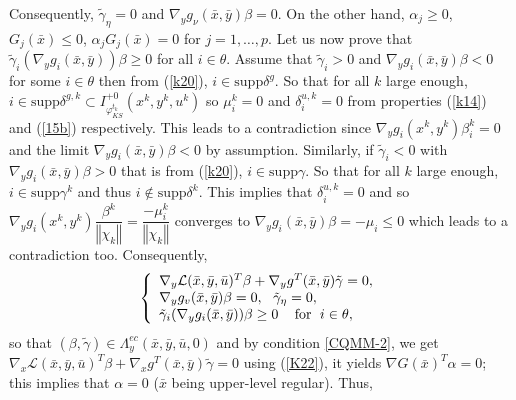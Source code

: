        	Consequently,
       	$  	\tilde{\gamma}_{\eta}=0$ and $\nabla_{y}g_{\nu}(\bar{x},\bar
       	{y})\beta=0$. On the other hand,
       	$\alpha_{j}\geq0$, $G_{j}(\bar{x})\leq0$, $\alpha_{j}G_{j}(\bar{x})=0$ for $j=1, \ldots, p$.	
       	Let us now prove that
       	$
       	\tilde{\gamma}_{i}(\nabla_{y}g_{i}(\bar{x},\bar{y}))\beta\geq0
       	$
       	for all $i\in\theta.$ Assume that $\tilde{\gamma}_{i}>0$ and $\nabla_{y}
       	g_{i}(\bar{x},\bar{y})\beta<0$ for some $i\in\theta$ then from (\ref{k20}),
       	$i\in\mathrm{supp}\delta^{g}.$ So that for all $k$ large enough,
       	$i\in\mathrm{supp}\delta^{g,k}\subset I_{\varphi^{t_{k}}_{KS}}^{+0}(x^{k},y^{k},u^{k})$
       	so $\mu_{i}^{k}=0$ and $\delta_{i}^{u,k}=0 $ from properties (\ref{k14}) and
       	(\ref{15b}) respectively. This leads to a contradiction since $\nabla_{y}
       	g_{i}(x^{k},y^{k})\beta_{i}^{k}=0 $ and the limit $\nabla_{y}g_{i}(\bar
       	{x},\bar{y})\beta<0$ by assumption. Similarly, if $\tilde{\gamma}_{i}<0$ with
       	$\nabla_{y}g_{i}(\bar{x},\bar{y})\beta>0$ that is from (\ref{k20}),
       	$i\in\mathrm{supp}\gamma.$ So that for all $k$ large enough, $i\in
       	\mathrm{supp}\gamma^{k}$ and thus $i\notin\mathrm{supp}\delta^{k}.$ This
       	implies that $\delta_{i}^{u,k}=0$ and so $\nabla_{y}g_{i}(x^{k},y^{k}%
       	)\dfrac{\beta^{k}}{\left\Vert \chi_{k}\right\Vert }=\dfrac{-\mu_{i}^{k}%
       	}{\left\Vert \chi_{k}\right\Vert }$ converges to $\nabla_{y}g_{i}(\bar{x}%
       	,\bar{y})\beta=-\mu_{i}\leq0$ which leads to a contradiction too.
       	Consequently, 
       	\[
       	\left\{
       	\begin{array}
       	[c]{l}%
       	\nabla_{y}\mathcal{L}(\bar{x},\bar{y},\bar{u})^{T}\beta+\nabla_{y}g^{T}%
       	(\bar{x},\bar{y})\tilde{\gamma}=0,\\
       	\nabla_{y}g_{v}(\bar{x},\bar{y})\beta=0,\text{ \ }\tilde{\gamma}_{\eta}=0,\\
       	\tilde{\gamma}_{i}(\nabla_{y}g_{i}(\bar{x},\bar{y}))\beta\geq
       	0\;\;\;\mbox{ for }\;i\in\theta,
       	\end{array}
       	\right.
       	\]
       	so that $(\beta,\tilde{\gamma})\in\Lambda_{y}^{ec}(\bar{x},\bar{y},\bar{u},0)$
       	and by condition \eqref{CQMM-2}, we get
       	$
       	\nabla_{x}\mathcal{L}(\bar{x},\bar{y},\bar{u})^{T}\beta+\nabla_{x}g^{T}
       	(\bar{x},\bar{y})\tilde{\gamma}=0
       	$
       	using (\ref{K22}), it yields $\nabla G(\bar{x})^{T}\alpha=0$; this implies
       	that $\alpha=0$ ($\bar{x}$ being upper-level regular). Thus,
